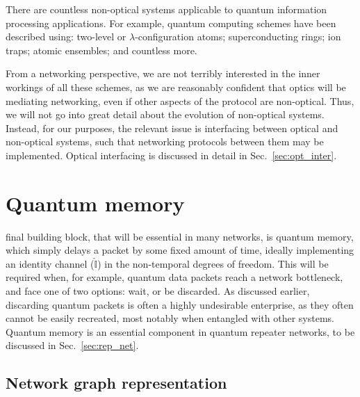 There are countless non-optical systems applicable to quantum information processing applications. For example, quantum computing schemes have been described using: two-level or $\lambda$-configuration atoms; superconducting rings; ion traps; atomic ensembles; and countless more.


From a networking perspective, we are not terribly interested in the inner workings of all these schemes, as we are reasonably confident that optics will be mediating networking, even if other aspects of the protocol are non-optical. Thus, we will not go into great detail about the evolution of non-optical systems. Instead, for our purposes, the relevant issue is interfacing between optical and non-optical systems, such that networking protocols between them may be implemented. Optical interfacing is discussed in detail in Sec.~\ref{sec:opt_inter}.

%
%

\section{Quantum memory} \label{sec:memory} 


 final building block, that will be essential in many networks, is quantum memory, which simply delays a packet by some fixed amount of time, ideally implementing an identity channel ($\hat{\mathbb{I}}$) in the non-temporal degrees of freedom. This will be required when, for example, quantum data packets reach a network bottleneck, and face one of two options: wait, or be discarded. As discussed earlier, discarding quantum packets is often a highly undesirable enterprise, as they often cannot be easily recreated, most notably when entangled with other systems. Quantum memory is an essential component in quantum repeater networks, to be discussed in Sec.~\ref{sec:rep_net}.

%
%

\subsection{Network graph representation}

